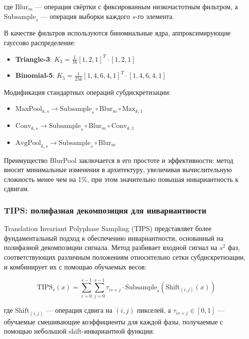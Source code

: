 где $\text{Blur}_{m}$ — операция свёртки с фиксированным низкочастотным фильтром, а $\text{Subsample}_{s}$ — операция выборки каждого $s$-го элемента.

В качестве фильтров используются биномиальные ядра, аппроксимирующие гауссово распределение:

\begin{itemize}
    \item \textbf{Triangle-3}: $K_3 = \frac{1}{16}[1, 2, 1]^T \cdot [1, 2, 1]$
    \item \textbf{Binomial-5}: $K_5 = \frac{1}{256}[1, 4, 6, 4, 1]^T \cdot [1, 4, 6, 4, 1]$
\end{itemize}

Модификация стандартных операций субдискретизации:

\begin{itemize}
    \item $\text{MaxPool}_{k,s} \rightarrow \text{Subsample}_{s} \circ \text{Blur}_{m} \circ \text{Max}_{k,1}$
    \item $\text{Conv}_{k,s} \rightarrow \text{Subsample}_{s} \circ \text{Blur}_{m} \circ \text{Conv}_{k,1}$
    \item $\text{AvgPool}_{k,s} \rightarrow \text{Subsample}_{s} \circ \text{Blur}_{m}$
\end{itemize}

Преимущество BlurPool заключается в его простоте и эффективности: метод вносит минимальные изменения в архитектуру, увеличивая вычислительную сложность менее чем на 1\%, при этом значительно повышая инвариантность к сдвигам.

\subsubsection{TIPS: полифазная декомпозиция для инвариантности}
\label{sec:methods:tips}

Translation Invariant Polyphase Sampling (TIPS) представляет более фундаментальный подход к обеспечению инвариантности, основанный на полифазной декомпозиции сигнала. Метод разбивает входной сигнал на $s^2$ фаз, соответствующих различным положениям относительно сетки субдискретизации, и комбинирует их с помощью обучаемых весов:

\begin{equation}
\text{TIPS}_s(x) = \sum_{i=0}^{s-1}\sum_{j=0}^{s-1} \tau_{is+j} \cdot \text{Subsample}_{s}(\text{Shift}_{(i,j)}(x))
\end{equation}

где $\text{Shift}_{(i,j)}$ — операция сдвига на $(i,j)$ пикселей, а $\tau_{is+j} \in [0,1]$ — обучаемые смешивающие коэффициенты для каждой фазы, получаемые с помощью небольшой shift-инвариантной функции.

